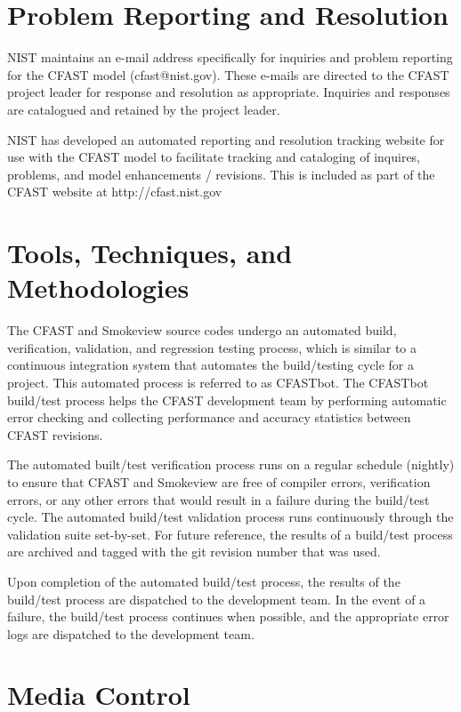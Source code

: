 \documentclass[12pt]{book}
\begin{document}
\section{Problem Reporting and Resolution}

NIST maintains an e-mail address specifically for inquiries and problem reporting for the CFAST model (cfast@nist.gov).  These e-mails are directed to the CFAST project leader for response and resolution as appropriate.  Inquiries and responses are catalogued and retained by the project leader.

NIST has developed an automated reporting and resolution tracking website for use with the CFAST model to facilitate tracking and cataloging of inquires, problems, and model enhancements / revisions. This is included as part of the CFAST website at http://cfast.nist.gov

\section{Tools, Techniques, and Methodologies}

The CFAST and Smokeview source codes undergo an automated build, verification, validation, and regression testing process, which is similar to a continuous integration system that automates the build/testing cycle for a project. This automated process is referred to as CFASTbot. The CFASTbot build/test process helps the CFAST development team by performing automatic error checking and collecting performance and accuracy statistics between CFAST revisions.

The automated built/test verification process runs on a regular schedule (nightly) to ensure that CFAST and Smokeview are free of compiler errors, verification errors, or any other errors that would result in a failure during the build/test cycle. The automated build/test validation process runs continuously through the validation suite set-by-set. For future reference, the results of a build/test process are archived and tagged with the git revision number that was used.

Upon completion of the automated build/test process, the results of the build/test process are dispatched to the development team. In the event of a failure, the build/test process continues when possible, and the appropriate error logs are dispatched to the development team.

\section{Media Control}
\end{document}
